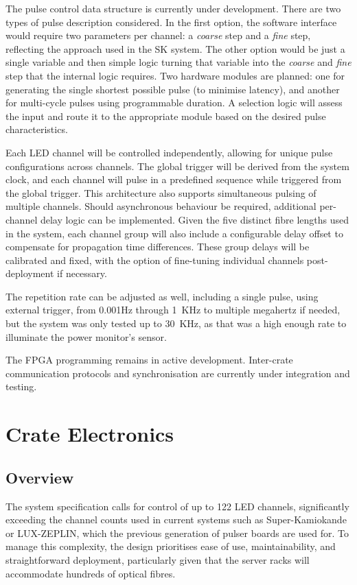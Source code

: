 \documentclass[a4paper,11pt]{article}
\begin{document}
The pulse control data structure is currently under development. There are two types of pulse description considered. In the first option, the software interface would require two parameters per channel: a \textit{coarse} step and a \textit{fine} step, reflecting the approach used in the SK system. The other option would be just a single variable and then simple logic turning that variable into the \textit{coarse} and \textit{fine} step that the internal logic requires. Two hardware modules are planned: one for generating the single shortest possible pulse (to minimise latency), and another for multi-cycle pulses using programmable duration. A selection logic will assess the input and route it to the appropriate module based on the desired pulse characteristics.

Each LED channel will be controlled independently, allowing for unique pulse configurations across channels. The global trigger will be derived from the system clock, and each channel will pulse in a predefined sequence while triggered from the global trigger. This architecture also supports simultaneous pulsing of multiple channels. Should asynchronous behaviour be required, additional per-channel delay logic can be implemented. Given the five distinct fibre lengths used in the system, each channel group will also include a configurable delay offset to compensate for propagation time differences. These group delays will be calibrated and fixed, with the option of fine-tuning individual channels post-deployment if necessary.

The repetition rate can be adjusted as well, including a single pulse, using external trigger, from 0.001Hz through 1~KHz to multiple megahertz if needed, but the system was only tested up to  30~KHz, as that was a high enough rate to illuminate the power monitor's sensor.

The FPGA programming remains in active development. Inter-crate communication protocols and synchronisation are currently under integration and testing.

\section{Crate Electronics}\label{sec:crate}

\subsection{Overview}

The system specification calls for control of up to 122 LED channels, significantly exceeding the channel counts used in current systems such as Super-Kamiokande or LUX-ZEPLIN, which the previous generation of pulser boards are used for. To manage this complexity, the design prioritises ease of use, maintainability, and straightforward deployment, particularly given that the server racks will accommodate hundreds of optical fibres.
\end{document}
